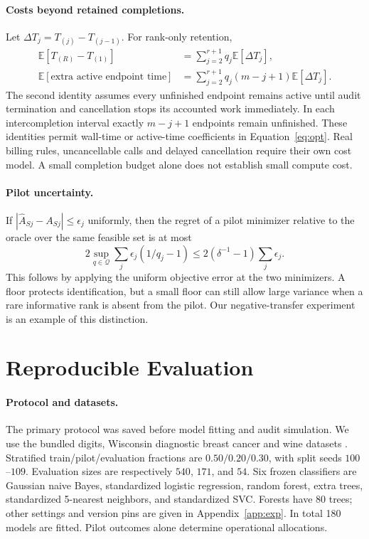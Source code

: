 \documentclass[12pt]{clear2027}
\newcommand{\E}{\mathbb{E}}
\begin{document}
\paragraph{Costs beyond retained completions.}
Let $\Delta T_j=T_{(j)}-T_{(j-1)}$. For rank-only retention,
\begin{align}
 \E[T_{(R)}-T_{(1)}]&=\sum_{j=2}^{r+1}q_j\E[\Delta T_j],\label{eq:wall}\\
 \E[\text{extra active endpoint time}]&=
 \sum_{j=2}^{r+1}q_j(m-j+1)\E[\Delta T_j].\label{eq:active}
\end{align}
The second identity assumes every unfinished endpoint remains active until audit termination and cancellation stops its accounted work immediately. In each intercompletion interval exactly $m-j+1$ endpoints remain unfinished. These identities permit wall-time or active-time coefficients in Equation~\eqref{eq:opt}. Real billing rules, uncancellable calls and delayed cancellation require their own cost model. A small completion budget alone does not establish small compute cost.

\paragraph{Pilot uncertainty.}
If $|\widehat A_{Sj}-A_{Sj}|\le\epsilon_j$ uniformly, then the regret of a pilot minimizer relative to the oracle over the same feasible set is at most
\begin{equation}
 2\sup_{q\in\mathcal Q}\sum_j\epsilon_j(1/q_j-1)
 \le2(\delta^{-1}-1)\sum_j\epsilon_j.\label{eq:regret}
\end{equation}
This follows by applying the uniform objective error at the two minimizers. A floor protects identification, but a small floor can still allow large variance when a rare informative rank is absent from the pilot. Our negative-transfer experiment is an example of this distinction.

\section{Reproducible Evaluation}
\paragraph{Protocol and datasets.}
The primary protocol was saved before model fitting and audit simulation. We use the bundled digits, Wisconsin diagnostic breast cancer and wine datasets \citep{datasets,pedregosa2011}. Stratified train/pilot/evaluation fractions are $0.50/0.20/0.30$, with split seeds $100$--$109$. Evaluation sizes are respectively $540$, $171$, and $54$. Six frozen classifiers are Gaussian naive Bayes, standardized logistic regression, random forest, extra trees, standardized 5-nearest neighbors, and standardized SVC. Forests have 80 trees; other settings and version pins are given in Appendix~\ref{app:exp}. In total 180 models are fitted. Pilot outcomes alone determine operational allocations.
\end{document}
